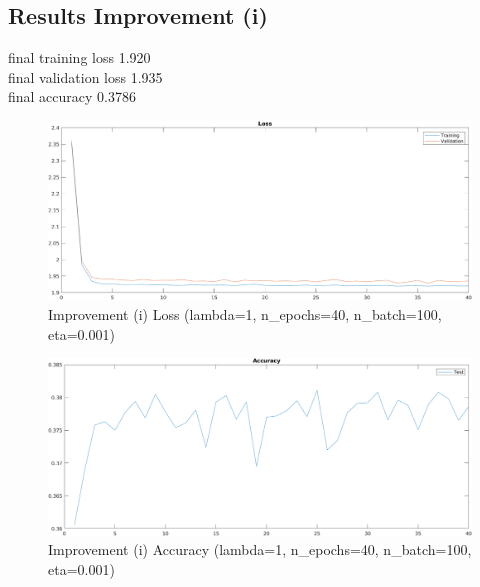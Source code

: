 \subsection{Results Improvement (i)} 

final training loss 1.920\\
final validation loss 1.935\\
final accuracy 0.3786\\
    \begin{figure}[ht]
        \includegraphics[width=\textwidth]{../code/result_pics/lambda=1, n_epochs=40, n_batch=100, eta=.001 all data for training/loss.png}
        \caption{Improvement (i) Loss (lambda=1, n\_epochs=40, n\_batch=100, eta=0.001)}
        \label{fig:lossa}
    \end{figure}
    \begin{figure}[ht]
        \includegraphics[width=\textwidth]{../code/result_pics/lambda=1, n_epochs=40, n_batch=100, eta=.001 all data for training/accuracy.png}
        \caption{Improvement (i) Accuracy (lambda=1, n\_epochs=40, n\_batch=100, eta=0.001)}
        \label{fig:accuracya}
    \end{figure}
